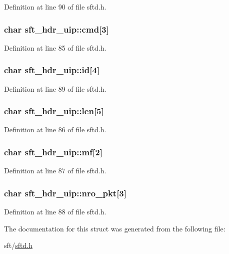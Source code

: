 Definition at line 90 of file sftd.h.

\hypertarget{structsft__hdr__uip_a2524d78df43082cbce489e0a78044285}{
\subsubsection[{cmd}]{\setlength{\rightskip}{0pt plus 5cm}char {\bf sft\_\-hdr\_\-uip::cmd}\mbox{[}3\mbox{]}}}
\label{structsft__hdr__uip_a2524d78df43082cbce489e0a78044285}


Definition at line 85 of file sftd.h.

\hypertarget{structsft__hdr__uip_a2d2b5f84a84e81873f22044d271e7898}{
\subsubsection[{id}]{\setlength{\rightskip}{0pt plus 5cm}char {\bf sft\_\-hdr\_\-uip::id}\mbox{[}4\mbox{]}}}
\label{structsft__hdr__uip_a2d2b5f84a84e81873f22044d271e7898}


Definition at line 89 of file sftd.h.

\hypertarget{structsft__hdr__uip_aa97a931508c8f23b3dc8a00723ee9a75}{
\subsubsection[{len}]{\setlength{\rightskip}{0pt plus 5cm}char {\bf sft\_\-hdr\_\-uip::len}\mbox{[}5\mbox{]}}}
\label{structsft__hdr__uip_aa97a931508c8f23b3dc8a00723ee9a75}


Definition at line 86 of file sftd.h.

\hypertarget{structsft__hdr__uip_afb2145a0a7cc70591facbf8ae04335be}{
\subsubsection[{mf}]{\setlength{\rightskip}{0pt plus 5cm}char {\bf sft\_\-hdr\_\-uip::mf}\mbox{[}2\mbox{]}}}
\label{structsft__hdr__uip_afb2145a0a7cc70591facbf8ae04335be}


Definition at line 87 of file sftd.h.

\hypertarget{structsft__hdr__uip_accc142816cf549a0c5806864038bd585}{
\subsubsection[{nro\_\-pkt}]{\setlength{\rightskip}{0pt plus 5cm}char {\bf sft\_\-hdr\_\-uip::nro\_\-pkt}\mbox{[}3\mbox{]}}}
\label{structsft__hdr__uip_accc142816cf549a0c5806864038bd585}


Definition at line 88 of file sftd.h.



The documentation for this struct was generated from the following file:\begin{DoxyCompactItemize}
\item 
sft/\hyperlink{sftd_8h}{sftd.h}\end{DoxyCompactItemize}
